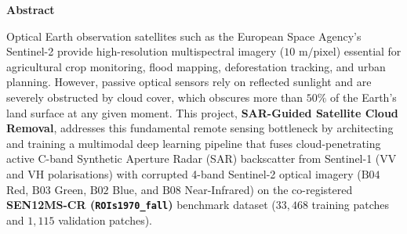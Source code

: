 \documentclass[12pt,a4paper]{report}
\newif\iffrontborder
\begin{document}
\frontborderfalse
\pagestyle{plain}
\setcounter{page}{1}
{}
\thispagestyle{plain}
\begin{center}
    \vspace*{0.4cm}
    {\LARGE \textbf{Abstract}}\\[1.0cm]
\end{center}

\noindent Optical Earth observation satellites such as the European Space Agency's Sentinel-2 provide high-resolution multispectral imagery ($10\text{ m/pixel}$) essential for agricultural crop monitoring, flood mapping, deforestation tracking, and urban planning. However, passive optical sensors rely on reflected sunlight and are severely obstructed by cloud cover, which obscures more than $50\%$ of the Earth's land surface at any given moment. This project, \textbf{SAR-Guided Satellite Cloud Removal}, addresses this fundamental remote sensing bottleneck by architecting and training a multimodal deep learning pipeline that fuses cloud-penetrating active C-band Synthetic Aperture Radar (SAR) backscatter from Sentinel-1 ($\text{VV}$ and $\text{VH}$ polarisations) with corrupted 4-band Sentinel-2 optical imagery ($\text{B04}$ Red, $\text{B03}$ Green, $\text{B02}$ Blue, and $\text{B08}$ Near-Infrared) on the co-registered \textbf{SEN12MS-CR (\texttt{ROIs1970\_fall})} benchmark dataset ($33{,}468$ training patches and $1{,}115$ validation patches).
\end{document}
